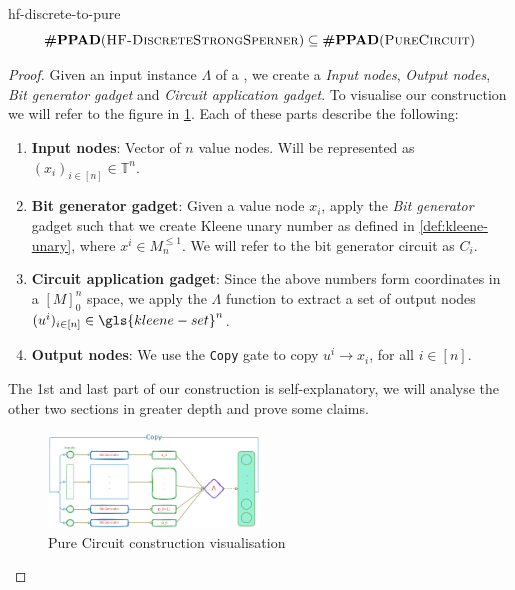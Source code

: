 \begin{theorembox}{}{hf-discrete-to-pure}
    $$
        \textbf{\#PPAD}(\textnormal{\textsc{HF-DiscreteStrongSperner}}) \subseteq \textbf{\#PPAD}(\textnormal{\textsc{PureCircuit}})
    $$
\end{theorembox}

\begin{proof}
    Given an input instance $\Lambda$ of a , we create a 
    \textit{Input nodes}, \textit{Output nodes}, \textit{Bit generator gadget} and \textit{Circuit application gadget}. To visualise our
    construction we will refer to the figure in \ref{fig:chap-3:pure-circuit}. Each of these parts describe the following:
    \begin{enumerate}
        \item  \textbf{Input nodes}: Vector of $n$ value nodes. Will be represented as $(x_i)_{i \in [n]} \in \mathbb{T}^n$.
        \item  \textbf{Bit generator gadget}: Given a value node $x_i$, apply the \textit{Bit generator} gadget such that we
              create Kleene unary number as defined in \ref{def:kleene-unary}, where $x^i \in M^{\leq 1}_n$. We will refer
              to the bit generator circuit as $C_i$.
        \item  \textbf{Circuit application gadget}: Since the above numbers form coordinates in a
              $[M]_0^n$ space, we apply the $\Lambda$ function to extract a set of output nodes $(u^i)_{i \in [n]} \in \gls{kleene-set}^n$.
        \item  \textbf{Output nodes}: We use the \texttt{Copy} gate to copy $u^i \to x_i$, for all $i \in [n]$.
    \end{enumerate}
    The 1st and last part of our construction is self-explanatory, we will analyse the other two sections in greater depth
    and prove some claims.

    \begin{figure}[h!]
        \centering
        \includegraphics[width=0.5\textwidth]{Chapter3/pure-circuit-reduction.pdf}
        \caption{Pure Circuit construction visualisation}
        \label{fig:chap-3:pure-circuit}
    \end{figure}

\end{proof}
